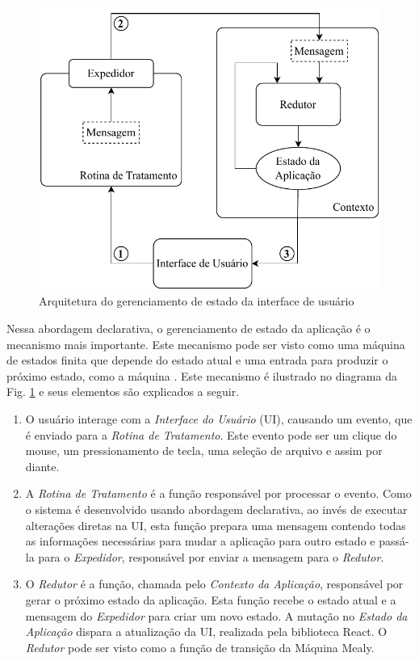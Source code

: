 \begin{figure}[!ht]
  \centering
  \caption{Arquitetura do gerenciamento de estado da interface de usuário}
  \label{fig:arch-front}
  \includegraphics[width=0.8\linewidth]{figures/flow_front.pdf}
\end{figure}

Nessa abordagem declarativa, o gerenciamento de estado da aplicação é o mecanismo mais importante. Este mecanismo pode ser visto como uma máquina de estados finita \cite{formal-methods} que depende do estado atual e uma entrada para produzir o próximo estado, como a máquina . Este mecanismo é ilustrado no diagrama da Fig. \ref{fig:arch-front} e seus elementos são explicados a seguir.

\begin{enumerate}
  \item O usuário interage com a \emph{Interface do Usuário} (UI), causando um evento, que é enviado para a \emph{Rotina de Tratamento}. Este evento pode ser um clique do mouse, um pressionamento de tecla, uma seleção de arquivo e assim por diante.
  \item A \emph{Rotina de Tratamento} é a função responsável por processar o evento. Como o sistema é desenvolvido usando abordagem declarativa, ao invés de executar alterações diretas na UI, esta função prepara uma mensagem contendo todas as informações necessárias para mudar a aplicação para outro estado e passá-la para o \emph{Expedidor}, responsável por enviar a mensagem para o \emph{Redutor}.
  \item O \emph{Redutor} é a função, chamada pelo \emph{Contexto da Aplicação}, responsável por gerar o próximo estado da aplicação. Esta função recebe o estado atual e a mensagem do \emph{Expedidor} para criar um novo estado. A mutação no \emph{Estado da Aplicação} dispara a atualização da UI, realizada pela biblioteca React. O \emph{Redutor} pode ser visto como a função de transição da Máquina Mealy.
\end{enumerate}


